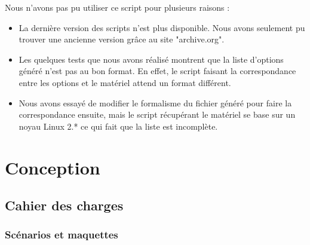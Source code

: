 \documentclass[16pts]{report}
\begin{document}
    Nous n'avons pas pu utiliser ce script pour plusieurs raisons :
    \begin{itemize}
        \item La dernière version des scripts n'est plus disponible. Nous avons
            seulement pu trouver une ancienne version grâce au site
            "archive.org".
        \item Les quelques tests que nous avons réalisé montrent que la liste
            d'options généré n'est pas au bon format. En effet, le script
            faisant la correspondance entre les options et le matériel attend
            un format différent.
        \item Nous avons essayé de modifier le formalisme du fichier généré
            pour faire la correspondance ensuite, mais le script récupérant le
            matériel se base sur un noyau Linux 2.* ce qui fait que la liste
            est incomplète.
    \end{itemize}

\chapter{Conception}
\label{cha:Conception}
    \section{Cahier des charges}
    \label{sec:Cahier des charges}
        \subsection{Scénarios et maquettes}
        \label{sub:Scénarios et maquettes}
\end{document}

